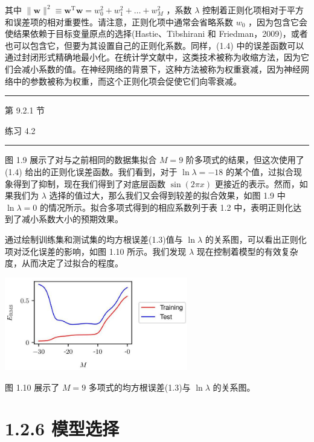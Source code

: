 \documentclass[10pt]{article}
\newcommand{\HRule}{\begin{center}\rule{0.9\linewidth}{0.2mm}\end{center}}
\begin{document}
其中 \(\parallel \mathbf{w}{\parallel }^{2} \equiv  {\mathbf{w}}^{\mathrm{T}}\mathbf{w} = {w}_{0}^{2} + {w}_{1}^{2} + \ldots  + {w}_{M}^{2}\) ，系数 \(\lambda\) 控制着正则化项相对于平方和误差项的相对重要性。请注意，正则化项中通常会省略系数 \({w}_{0}\) ，因为包含它会使结果依赖于目标变量原点的选择(Hastie、Tibshirani 和 Friedman，2009)，或者也可以包含它，但要为其设置自己的正则化系数。同样，(1.4) 中的误差函数可以通过封闭形式精确地最小化。在统计学文献中，这类技术被称为收缩方法，因为它们会减小系数的值。在神经网络的背景下，这种方法被称为权重衰减，因为神经网络中的参数被称为权重，而这个正则化项会促使它们向零衰减。

\HRule

第 9.2.1 节

练习 4.2

\HRule

图 1.9 展示了对与之前相同的数据集拟合 \(M = 9\) 阶多项式的结果，但这次使用了 (1.4) 给出的正则化误差函数。我们看到，对于 \(\ln \lambda  =  - {18}\) 的某个值，过拟合现象得到了抑制，现在我们得到了对底层函数 \(\sin \left( {2\pi x}\right)\) 更接近的表示。然而，如果我们为 \(\lambda\) 选择的值过大，那么我们又会得到较差的拟合效果，如图 1.9 中 \(\ln \lambda  = 0\) 的情况所示。拟合多项式得到的相应系数列于表 1.2 中，表明正则化达到了减小系数大小的预期效果。

通过绘制训练集和测试集的均方根误差(1.3)值与 \(\ln \lambda\) 的关系图，可以看出正则化项对泛化误差的影响，如图 1.10 所示。我们发现 \(\lambda\) 现在控制着模型的有效复杂度，从而决定了过拟合的程度。

\begin{center}
\includegraphics[max width=0.6\textwidth]{images/0194e279-9b28-703a-88f4-c3ac21e2010d_33_798_344_753_382_0.jpg}
\end{center}
\hspace*{3em} 

图 1.10 展示了 \(M = 9\) 多项式的均方根误差(1.3)与 \(\ln \lambda\) 的关系图。

\section*{1.2.6 模型选择}
\end{document}
